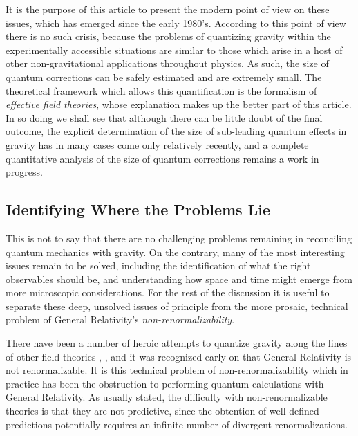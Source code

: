 \documentclass[12pt]{JHEP3}
\begin{document}
It is the purpose of this article to present the modern point of
view on these issues, which has emerged since the early 1980's.
According to this point of view there is no such crisis, because
the problems of quantizing gravity within the experimentally
accessible situations are similar to those which arise in a host
of other non-gravitational applications throughout physics. As
such, the size of quantum corrections can be safely estimated and
are extremely small. The theoretical framework which allows this
quantification is the formalism of \emph{effective field
theories}, whose explanation makes up the better part of this
article. In so doing we shall see that although there can be
little doubt of the final outcome, the explicit determination of
the size of sub-leading quantum effects in gravity has in many
cases come only relatively recently, and a complete quantitative
analysis of the size of quantum corrections remains a work in
progress.

\subsection{Identifying Where the Problems Lie}
%
This is not to say that there are no challenging problems
remaining in reconciling quantum mechanics with gravity. On the
contrary, many of the most interesting issues remain to be solved,
including the identification of what the right observables should
be, and understanding how space and time might emerge from more
microscopic considerations. For the rest of the discussion it is
useful to separate these deep, unsolved issues of principle from
the more prosaic, technical problem of General Relativity's
\emph{non-renormalizability}.

There have been a number of heroic attempts to quantize gravity
along the lines of other field theories \cite{EarlyQG},
\cite{CanonQG}, \cite{LivRev-QG} and it was recognized early on
that General Relativity is not renormalizable. It is this
technical problem of non-renormalizability which in practice has
been the obstruction to performing quantum calculations with
General Relativity. As usually stated, the difficulty with
non-renormalizable theories is that they are not predictive, since
the obtention of well-defined predictions potentially requires an
infinite number of divergent renormalizations.
\end{document}
